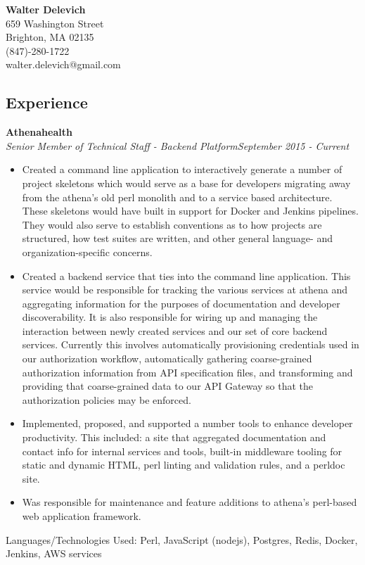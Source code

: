 \documentclass[10pt]{res}
\begin{document}
\thispagestyle{empty} %

\begin{center}
\textbf{\Large{Walter Delevich}}\\
659 Washington Street\\
Brighton, MA 02135\\
(847)-280-1722 \\
walter.delevich@gmail.com
\end{center}

\begin{resume}
  
\section{\large{Experience}}
\vspace{8pt} 
\textbf{Athenahealth} \\
{\sl \small{Senior Member of Technical Staff - Backend Platform\hfill September 2015 - Current }} \\
  \begin{itemize} \itemsep -1pt %
    \item Created a command line application to interactively generate a number of project skeletons which would serve as a base for developers migrating away from the athena's old perl monolith and to a service based architecture. These skeletons would have built in support for Docker and Jenkins pipelines. They would also serve to establish conventions as to how projects are structured, how test suites are written, and other general language- and organization-specific concerns.
    \item Created a backend service that ties into the command line application. This service would be responsible for tracking the various services at athena and aggregating information for the purposes of documentation and developer discoverability. It is also responsible for wiring up and managing the interaction between newly created services and our set of core backend services. Currently this involves automatically provisioning credentials used in our authorization workflow, automatically gathering coarse-grained authorization information from API specification files, and transforming and providing that coarse-grained data to our API Gateway so that the authorization policies may be enforced.
    \item Implemented, proposed, and supported a number tools to enhance developer productivity. This included: a site that aggregated documentation and contact info for internal services and tools, built-in middleware tooling for static and dynamic HTML, perl linting and validation rules, and a perldoc site.
    \item Was responsible for maintenance and feature additions to athena's perl-based web application framework.
  \end{itemize} \vspace{-6pt}
\small{Languages/Technologies Used: Perl, JavaScript (nodejs), Postgres, Redis, Docker, Jenkins, AWS services}


\end{resume}
\end{document}
